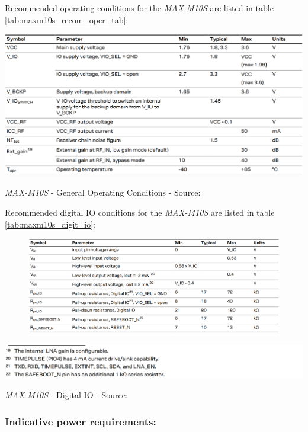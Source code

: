 \documentclass[report.tex]{subfiles}
\begin{document}
Recommended operating conditions for the \textit{MAX-M10S} are listed in table \ref{tab:maxm10s_recom_oper_tab}:

\begin{table}[H]
	\centering
	\includegraphics[width=1\textwidth]{Include/Figure/comp/maxm10s_recom_oper_tab.png}
\caption{\textit{MAX-M10S} - General Operating Conditions - Source: \cite{MAXM10S}}
\label{tab:maxm10s_recom_oper_tab}
\end{table}

Recommended digital IO conditions for the \textit{MAX-M10S} are listed in table \ref{tab:maxm10s_digit_io}:

\begin{table}[H]
\begin{subfigure}{\textwidth}
	\centering
	\includegraphics[width=1\textwidth]{Include/Figure/comp/maxm10s_digit_io.png}
\end{subfigure}
	\centering
	\includegraphics[width=1\textwidth]{Include/Figure/comp/maxm10s_digit_io2.png}
\caption{\textit{MAX-M10S} - Digital IO - Source: \cite{MAXM10S}}
\label{tab:maxm10s_digit_io}
\end{table}

\subsubsection{Indicative power requirements:}
\end{document}
